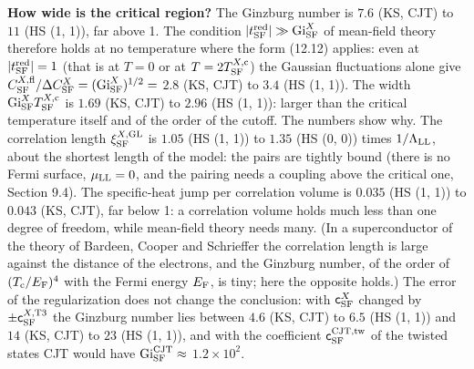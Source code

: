 \documentclass[
  10pt,
]{article}
\begin{document}
\textbf{How wide is the critical region?} The Ginzburg number is \(7.6\)
(KS, CJT) to \(11\) (HS (1, 1)), far above 1. The condition
\(\lvert t^{\rm red}_{\rm SF}\rvert\gg{\rm Gi}^{X}_{\rm SF}\) of
mean-field theory therefore holds at no temperature where the form
(12.12) applies: even at \(\lvert t^{\rm red}_{\rm SF}\rvert=1\) (that
is at \(T=0\) or at \(T=2T^{X,{\rm c}}_{\rm SF}\)) the Gaussian
fluctuations alone give
\(C^{X,{\rm fl}}_{\rm SF}/\Delta C^X_{\rm SF}=({\rm Gi}^{X}_{\rm SF})^{1/2}=\)
\(2.8\) (KS, CJT) to \(3.4\) (HS (1, 1)). The width
\({\rm Gi}^{X}_{\rm SF}T^{X,{\rm c}}_{\rm SF}\) is \(1.69\) (KS, CJT) to
\(2.96\) (HS (1, 1)): larger than the critical temperature itself and of
the order of the cutoff. The numbers show why. The correlation length
\(\xi^{X,{\rm GL}}_{\rm SF}\) is \(1.05\) (HS (1, 1)) to \(1.35\) (HS
(0, 0)) times \(1/\Lambda_{\rm LL}\), about the shortest length of the
model: the pairs are tightly bound (there is no Fermi surface,
\(\mu_{\rm LL}=0\), and the pairing needs a coupling above the critical
one, Section 9.4). The specific-heat jump per correlation volume is
\(0.035\) (HS (1, 1)) to \(0.043\) (KS, CJT), far below 1: a correlation
volume holds much less than one degree of freedom, while mean-field
theory needs many. (In a superconductor of the theory of Bardeen, Cooper
and Schrieffer the correlation length is large against the distance of
the electrons, and the Ginzburg number, of the order of
\((T_{\rm c}/E_{\rm F})^4\) with the Fermi energy \(E_{\rm F}\), is
tiny; here the opposite holds.) The error of the regularization does not
change the conclusion: with \(\mathsf c^X_{\rm SF}\) changed by
\(\pm\mathsf c^{X,{\rm T3}}_{\rm SF}\) the Ginzburg number lies between
\(4.6\) (KS, CJT) to \(6.5\) (HS (1, 1)) and \(14\) (KS, CJT) to \(23\)
(HS (1, 1)), and with the coefficient
\(\mathsf c^{\rm CJT,tw}_{\rm SF}\) of the twisted states CJT would have
\({\rm Gi}^{\rm CJT}_{\rm SF}\approx\) \(1.2\times10^{2}\).
\end{document}
